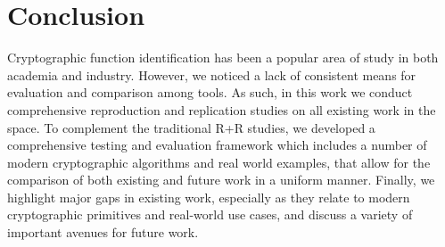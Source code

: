 \section{Conclusion}

Cryptographic function identification has been a popular area of study in both academia and industry. However, we noticed a lack of consistent means for evaluation and comparison among tools.
As such, in this work we conduct comprehensive reproduction and replication studies on all existing work in the space.
To complement the traditional R+R studies, we developed a comprehensive testing and evaluation framework which includes a number of modern cryptographic algorithms and real world examples, that allow for the comparison of both existing and future work in a uniform manner.
Finally, we highlight major gaps in existing work, especially as they relate to modern cryptographic primitives and real-world use cases,
and discuss a variety of important avenues for future work.